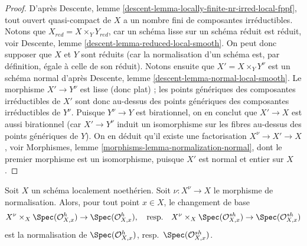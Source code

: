 \begin{proof}
D'après Descente, lemme \ref{descent-lemma-locally-finite-nr-irred-local-fppf},
tout ouvert quasi-compact de $X$ a un nombre fini de composantes irréductibles.
Notons que $X_{red} = X \times_Y Y_{red}$, car un schéma lisse sur un schéma
réduit est réduit, voir
Descente, lemme \ref{descent-lemma-reduced-local-smooth}.
On peut donc supposer que $X$ et $Y$ sont réduits (car la normalisation
d'un schéma est, par définition, égale à celle de son réduit).
Notons ensuite que $X' = X \times_Y Y^\nu$ est un schéma normal
d'après Descente, lemme \ref{descent-lemma-normal-local-smooth}.
Le morphisme $X' \to Y^\nu$ est lisse (donc plat) ; les points génériques
des composantes irréductibles de $X'$ sont donc au-dessus des points génériques
des composantes irréductibles de $Y^\nu$. Puisque $Y^\nu \to Y$ est birationnel,
on en conclut que $X' \to X$ est aussi birationnel (car $X' \to Y^\nu$
induit un isomorphisme sur les fibres au-dessus des points génériques de $Y$).
On en déduit qu'il existe une factorisation
$X^\nu \to X' \to X$, voir
Morphismes, lemme \ref{morphisms-lemma-normalization-normal},
dont le premier morphisme est un isomorphisme, puisque $X'$ est normal et entier sur $X$.
\end{proof}

\begin{lemma}
\label{lemma-normalization-and-henselization}
Soit $X$ un schéma localement noethérien. Soit $\nu : X^\nu \to X$
le morphisme de normalisation. Alors, pour tout point $x \in X$,
le changement de base
$$
X^\nu \times_X \Spec(\mathcal{O}_{X, x}^h) \to \Spec(\mathcal{O}_{X, x}^h),
\quad\text{resp.}\quad
X^\nu \times_X \Spec(\mathcal{O}_{X, x}^{sh}) \to \Spec(\mathcal{O}_{X, x}^{sh})
$$
est la normalisation de $\Spec(\mathcal{O}_{X, x}^h)$,
resp.\ $\Spec(\mathcal{O}_{X, x}^{sh})$.
\end{lemma}

